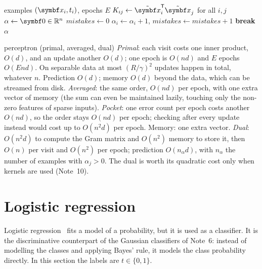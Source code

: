 \documentclass[11pt]{article}
\newcommand{\xt}{\tilde{\x}}
\newcommand{\sign}{\operatorname{sign}}
\begin{document}
\begin{algorithm}[htbp]
\caption{The perceptron in dual form.}\label{alg:dualperc}
\begin{algorithmic}[1]
\Require examples $(\x_i, t_i)$, epochs $E$
\State $K_{ij} \gets \xt_i\T\xt_j$ for all $i, j$ 
\State $\alpha \gets \vect{0} \in \R^n$
  \State $\mathit{mistakes} \gets 0$
     
      \State $\alpha_i \gets \alpha_i + 1$, \quad $\mathit{mistakes} \gets \mathit{mistakes} + 1$
    \EndIf
  \EndFor
   \textbf{break}
  \EndIf
\EndFor
\State \Return $\alpha$ \Comment{predict with $\sign\big(\sum_j \alpha_j t_j\,\xt_j\T\xt\big)$}
\end{algorithmic}
\end{algorithm}

\begin{runtime}{perceptron (primal, averaged, dual)}
\emph{Primal}: each visit costs one inner product, $O(d)$, and an update another $O(d)$; one epoch is $O(nd)$ and $E$
epochs $O(End)$. On separable data at most $(R/\gamma)^2$ updates happen in total, whatever $n$. Prediction $O(d)$;
memory $O(d)$ beyond the data, which can be streamed from disk. \emph{Averaged}: the same order, $O(nd)$ per epoch, with one
extra vector of memory (the sum can even be maintained lazily, touching only the non-zero features of sparse inputs).
\emph{Pocket}: one error count per epoch costs another $O(nd)$, so the order stays $O(nd)$ per epoch; checking after every
update instead would cost up to $O(n^2d)$ per epoch. Memory: one extra vector. \emph{Dual}: $O(n^2 d)$ to compute the Gram matrix and $O(n^2)$ memory to store it, then $O(n)$ per visit and $O(n^2)$ per
epoch; prediction $O(n_\alpha d)$, with $n_\alpha$ the number of examples with $\alpha_j > 0$. The dual is worth its
quadratic cost only when kernels are used (Note~10).
\end{runtime}

\section{Logistic regression}\label{sec:logistic}

Logistic regression~\cite{cox1958} fits a model of a probability, but it is used as a classifier. It is the discriminative counterpart of the Gaussian
classifiers of Note~6: instead of modelling the classes and applying Bayes' rule, it models the class probability
directly. In this section the labels are $t \in \{0, 1\}$.
\end{document}
